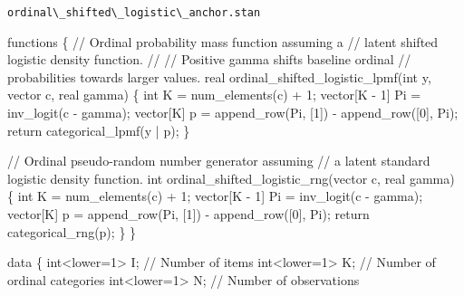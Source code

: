 \documentclass[
  letterpaper,
  DIV=11,
  numbers=noendperiod]{scrartcl}
\newenvironment{Shaded}{\begin{snugshade}}{\end{snugshade}}
\newcommand{\CommentTok}[1]{\textcolor[rgb]{0.37,0.37,0.37}{#1}}
\newcommand{\ControlFlowTok}[1]{\textcolor[rgb]{0.00,0.23,0.31}{#1}}
\newcommand{\DataTypeTok}[1]{\textcolor[rgb]{0.68,0.00,0.00}{#1}}
\newcommand{\DecValTok}[1]{\textcolor[rgb]{0.68,0.00,0.00}{#1}}
\newcommand{\KeywordTok}[1]{\textcolor[rgb]{0.00,0.23,0.31}{#1}}
\newcommand{\NormalTok}[1]{\textcolor[rgb]{0.00,0.23,0.31}{#1}}
\begin{document}
\begin{codelisting}

\caption{\texttt{ordinal\textbackslash\_shifted\textbackslash\_logistic\textbackslash\_anchor.stan}}

\begin{Shaded}
\begin{Highlighting}[]
\KeywordTok{functions}\NormalTok{ \{}
  \CommentTok{// Ordinal probability mass function assuming a}
  \CommentTok{// latent shifted logistic density function.}
  \CommentTok{//}
  \CommentTok{// Positive gamma shifts baseline ordinal}
  \CommentTok{// probabilities towards larger values.}
  \DataTypeTok{real}\NormalTok{ ordinal\_shifted\_logistic\_lpmf(}\DataTypeTok{int}\NormalTok{ y, }\DataTypeTok{vector}\NormalTok{ c, }\DataTypeTok{real}\NormalTok{ gamma) \{}
    \DataTypeTok{int}\NormalTok{ K = num\_elements(c) + }\DecValTok{1}\NormalTok{;}
    \DataTypeTok{vector}\NormalTok{[K {-} }\DecValTok{1}\NormalTok{] Pi = inv\_logit(c {-} gamma);}
    \DataTypeTok{vector}\NormalTok{[K] p = append\_row(Pi, [}\DecValTok{1}\NormalTok{]\textquotesingle{}) {-} append\_row([}\DecValTok{0}\NormalTok{]\textquotesingle{}, Pi);}
    \ControlFlowTok{return}\NormalTok{ categorical\_lpmf(y | p);}
\NormalTok{  \}}

  \CommentTok{// Ordinal pseudo{-}random number generator assuming}
  \CommentTok{// a latent standard logistic density function.}
  \DataTypeTok{int}\NormalTok{ ordinal\_shifted\_logistic\_rng(}\DataTypeTok{vector}\NormalTok{ c, }\DataTypeTok{real}\NormalTok{ gamma) \{}
    \DataTypeTok{int}\NormalTok{ K = num\_elements(c) + }\DecValTok{1}\NormalTok{;}
    \DataTypeTok{vector}\NormalTok{[K {-} }\DecValTok{1}\NormalTok{] Pi = inv\_logit(c {-} gamma);}
    \DataTypeTok{vector}\NormalTok{[K] p = append\_row(Pi, [}\DecValTok{1}\NormalTok{]\textquotesingle{}) {-} append\_row([}\DecValTok{0}\NormalTok{]\textquotesingle{}, Pi);}
    \ControlFlowTok{return}\NormalTok{ categorical\_rng(p);}
\NormalTok{  \}}
\NormalTok{\}}

\KeywordTok{data}\NormalTok{ \{}
  \DataTypeTok{int}\NormalTok{\textless{}}\KeywordTok{lower}\NormalTok{=}\DecValTok{1}\NormalTok{\textgreater{} I; }\CommentTok{// Number of items}
  \DataTypeTok{int}\NormalTok{\textless{}}\KeywordTok{lower}\NormalTok{=}\DecValTok{1}\NormalTok{\textgreater{} K; }\CommentTok{// Number of ordinal categories}
  \DataTypeTok{int}\NormalTok{\textless{}}\KeywordTok{lower}\NormalTok{=}\DecValTok{1}\NormalTok{\textgreater{} N; }\CommentTok{// Number of observations}


\end{Highlighting}
\end{Shaded}
\end{codelisting}
\end{document}
